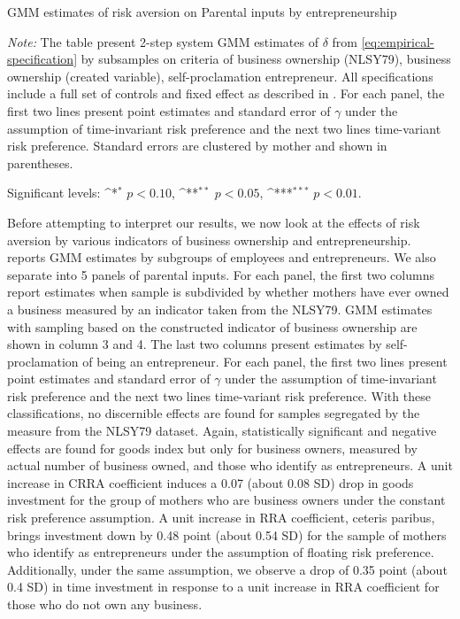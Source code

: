 \documentclass[emulatestandardclasses, 10pt, abstract = true]{scrartcl}
\begin{document}
\begin{table}[!htbp]
	\centering
	\begin{threeparttable}
		\def\sym#1{\ifmmode^{#1}\else\(^{#1}\)\fi}
		\caption{GMM estimates of risk aversion on Parental inputs by entrepreneurship}	
		\setlength{\extrarowheight}{0.3em}
		
		\label{table:result-entrepreneur}
		\begin{tablenotes}[flushleft] \footnotesize
			\item \textit{Note:} The table present 2-step system GMM estimates of $\delta$ from \eqref{eq:empirical-specification} by subsamples on criteria of business ownership (NLSY79), business ownership (created variable), self-proclamation entrepreneur. All specifications include a full set of controls and fixed effect as described in . For each panel, the first two lines present point estimates and standard error of $\gamma$ under the assumption of time-invariant risk preference and the next two lines time-variant risk preference. Standard errors are clustered by mother and shown in parentheses. 
			\item Significant levels: \sym{*} \(p<0.10\), \sym{**} \(p<0.05\), \sym{***} \(p<0.01\).
		\end{tablenotes}
	\end{threeparttable}
\end{table}


Before attempting to interpret our results, we now look at the effects of risk aversion by various indicators of business ownership and entrepreneurship.  reports GMM estimates by subgroups of employees and entrepreneurs. We also separate  into 5 panels of parental inputs. For each panel, the first two columns report estimates when sample is subdivided by whether mothers have ever owned a business measured by an indicator taken from the NLSY79. GMM estimates with sampling based on the constructed indicator of business ownership are shown in column 3 and 4. The last two columns present estimates by self-proclamation of being an entrepreneur. For each panel, the first two lines present point estimates and standard error of $\gamma$ under the assumption of time-invariant risk preference and the next two lines time-variant risk preference. With these classifications, no discernible effects are found for samples segregated by the measure from the NLSY79 dataset. Again, statistically significant and negative effects are found for goods index but only for business owners, measured by actual number of business owned, and those who identify as entrepreneurs. A unit increase in CRRA coefficient induces a 0.07 (about 0.08 SD) drop in goods investment for the group of mothers who are business owners under the constant risk preference assumption. A unit increase in RRA coefficient, ceteris paribus, brings investment down by 0.48 point (about 0.54 SD) for the sample of mothers who identify as entrepreneurs under the assumption of floating risk preference. Additionally, under the same assumption, we observe a drop of 0.35 point (about 0.4 SD) in time investment in response to a unit increase in RRA coefficient for those who do not own any business.  
\end{document}
